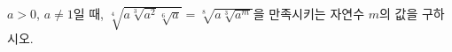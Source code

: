 $a>0$, $a\ne1$일 때, $\sqrt[4]{a\sqrt[3]{a^2}\sqrt[6]{a}}=\sqrt[8]{a\sqrt[3]{a^m}}$을 만족시키는 자연수 $m$의 값을 구하시오.
